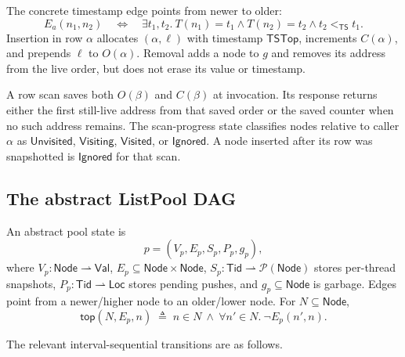 \documentclass[11pt]{article}
\theoremstyle{definition}
\theoremstyle{remark}
\newcommand{\Tid}{\mathsf{Tid}}
\newcommand{\Loc}{\mathsf{Loc}}
\newcommand{\Val}{\mathsf{Val}}
\newcommand{\Node}{\mathsf{Node}}
\newcommand{\TS}{\mathsf{TS}}
\newcommand{\topts}{\mathsf{TSTop}}
\newcommand{\arrayedge}{E_{\!a}}
\begin{document}
The concrete timestamp edge points from newer to older:
\[
  \arrayedge(n_1,n_2)
  \quad\Longleftrightarrow\quad
  \exists t_1,t_2.\ T(n_1)=t_1\land T(n_2)=t_2\land t_2<_{\TS}t_1.
\]
Insertion in row \(\alpha\) allocates \((\alpha,\ell)\) with timestamp
\(\topts\), increments \(C(\alpha)\), and prepends \(\ell\) to
\(O(\alpha)\).  Removal adds a node to \(g\) and removes its address from the
live order, but does not erase its value or timestamp.

A row scan saves both \(O(\beta)\) and \(C(\beta)\) at invocation.  Its
response returns either the first still-live address from that saved order or
the saved counter when no such address remains.  The scan-progress state
classifies nodes relative to caller \(\alpha\) as
\(\mathsf{Unvisited}\), \(\mathsf{Visiting}\),
\(\mathsf{Visited}\), or \(\mathsf{Ignored}\).  A node inserted after its row
was snapshotted is \(\mathsf{Ignored}\) for that scan.

\subsection{The abstract ListPool DAG}

An abstract pool state is
\[
  p=(V_p,E_p,S_p,P_p,g_p),
\]
where \(V_p:\Node\rightharpoonup\Val\),
\(E_p\subseteq\Node\times\Node\),
\(S_p:\Tid\rightharpoonup\mathcal P(\Node)\) stores per-thread snapshots,
\(P_p:\Tid\rightharpoonup\Loc\) stores pending pushes, and
\(g_p\subseteq\Node\) is garbage.  Edges point from a newer/higher node to an
older/lower node.  For \(N\subseteq\Node\),
\[
  \mathsf{top}(N,E_p,n)
  \;\triangleq\;
  n\in N\ \land\ \forall n'\in N.\ \neg E_p(n',n).
\]

The relevant interval-sequential transitions are as follows.
\end{document}
